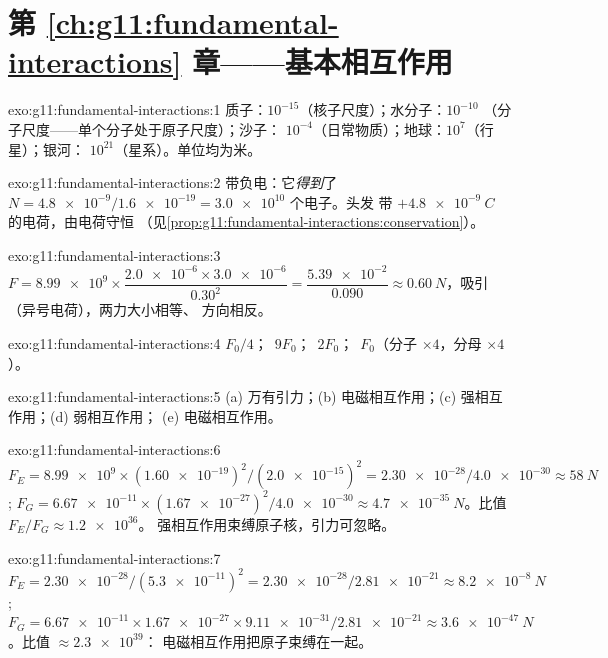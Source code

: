 \section*{第 \ref{ch:g11:fundamental-interactions} 章——基本相互作用}

\begin{solution}{exo:g11:fundamental-interactions:1}
质子：$10^{-15}$（核子尺度）；水分子：$10^{-10}$
（分子尺度——单个分子处于原子尺度）；沙子：
$10^{-4}$（日常物质）；地球：$10^{7}$（行星）；银河：
$10^{21}$（星系）。单位均为米。
\end{solution}

\begin{solution}{exo:g11:fundamental-interactions:2}
带负电：它\emph{得到}了
$N = \num{4.8e-9}/\num{1.6e-19} = \num{3.0e10}$ 个电子。头发
带 $+\qty{4.8e-9}{C}$ 的电荷，由电荷守恒
（见\cref{prop:g11:fundamental-interactions:conservation}）。
\end{solution}

\begin{solution}{exo:g11:fundamental-interactions:3}
$F = \num{8.99e9} \times \dfrac{\num{2.0e-6} \times \num{3.0e-6}}{0.30^2}
= \dfrac{\num{5.39e-2}}{0.090} \approx \qty{0.60}{N}$，吸引
（异号电荷），两力大小相等、
方向相反。
\end{solution}

\begin{solution}{exo:g11:fundamental-interactions:4}
$F_0/4$；\ $9F_0$；\ $2F_0$；\ $F_0$（分子 $\times 4$，分母
$\times 4$）。
\end{solution}

\begin{solution}{exo:g11:fundamental-interactions:5}
(a) 万有引力；(b) 电磁相互作用；(c) 强相互作用；(d) 弱相互作用；
(e) 电磁相互作用。
\end{solution}

\begin{solution}{exo:g11:fundamental-interactions:6}
$F_E = \num{8.99e9} \times (\num{1.60e-19})^2/(\num{2.0e-15})^2
= \num{2.30e-28}/\num{4.0e-30} \approx \qty{58}{N}$;
$F_G = \num{6.67e-11} \times (\num{1.67e-27})^2/\num{4.0e-30}
\approx \qty{4.7e-35}{N}$。比值 $F_E/F_G \approx \num{1.2e36}$。
强相互作用束缚原子核，引力可忽略。
\end{solution}

\begin{solution}{exo:g11:fundamental-interactions:7}
$F_E = \num{2.30e-28}/(\num{5.3e-11})^2 = \num{2.30e-28}/\num{2.81e-21}
\approx \qty{8.2e-8}{N}$;
$F_G = \num{6.67e-11} \times \num{1.67e-27} \times \num{9.11e-31} /
\num{2.81e-21} \approx \qty{3.6e-47}{N}$。比值 $\approx \num{2.3e39}$：
电磁相互作用把原子束缚在一起。
\end{solution}

